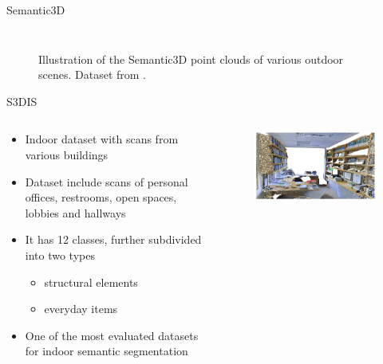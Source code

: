 \documentclass[aspectratio=169]{beamer}
\begin{document}
\begin{frame}{Semantic3D}
\begin{columns}
\begin{column}{0.33\textwidth}
\begin{figure}
            \end{figure}
        \end{column}
    \end{columns}
    \begin{figure}
        \centering
        \caption{Illustration of the Semantic3D point clouds of various outdoor scenes. Dataset from \cite[]{hackel2017semantic3d}.}
    \end{figure}
\end{frame}
\begin{frame}{S3DIS}
    \begin{columns}
        \begin{column}{0.6\textwidth}
            \begin{itemize}
                \item Indoor dataset with scans from various buildings
                \item Dataset include scans of personal offices, restrooms, open spaces, lobbies and hallways
                \item It has 12 classes, further subdivided into two types
                \begin{itemize}
                    \item structural elements 
                    \item everyday items
                \end{itemize}
                \item One of the most evaluated datasets for indoor semantic segmentation
            \end{itemize}
        \end{column}
        \begin{column}{0.4\textwidth}
            \begin{figure}
                \centering
                \includegraphics[scale=0.35]{images/s3dis/s3dis_sample_1.jpg}

\end{figure}
\end{column}
\end{columns}
\end{frame}
\end{document}

